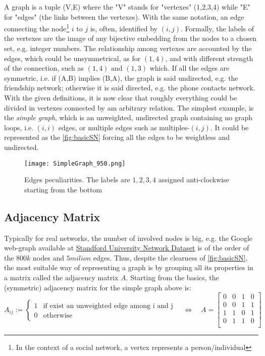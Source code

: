 \documentclass[a4paper,10pt,twoside]{book} %
\theoremstyle{definition}
\begin{document}
A graph is a tuple (V,E) where the "V" stands for "vertexes" (1,2,3,4) while "E" for "edges" (the links between the vertexes).
With the same notation, an edge connecting the node\footnote{In the context of a social network, a vertex represents a person/individual} $i$ to $j$ is, often, identified by $(i,j)$.
Formally, the labels of the vertexes are the image of any bijective embedding from the nodes to a chosen set, e.g. integer numbers. The relationship among vertexes are accounted by the edges, which could be unsymmetrical, as for $(1,4)$, and with different strength of the connection, such as $(1,4) \text{ and } (1,3)$ which. If all the edges are symmetric, i.e. if (A,B) implies (B,A), the graph is said undirected, e.g. the friendship network; otherwise it is said directed, e.g. the phone contacts network. 
With the given definitions, it is now clear that roughly everything could be divided in vertexes connected by am arbitrary relation.
The simplest example, is the \textit{simple graph}, which is an unweighted, undirected graph containing no graph loops, i.e. $(i,i)$ edges, or multiple edges such as multiples-$(i,j)$. It could be represented as the \autoref{fig:basicSN} forcing all the edges to be weightless and undirected.
\begin{figure}[ht]
	\texttt{[image: SimpleGraph\_950.png]}
	\caption{Edges peculiarities. The labels are $1,2,3,4$ assigned anti-clockwise starting from the bottom}
	\label{fig:simple}
\end{figure}
\newpage

\subsection{Adjacency Matrix}
Typically for real networks, the number of involved nodes is big, e.g. the Google web-graph available at \href{https://snap.stanford.edu/data/#socnets}{Standford University Network Dataset} is of the order of the $800k$ nodes and $5milion$ edges. Thus, despite the clearness of \autoref{fig:basicSN}, the most suitable way of representing a graph is by grouping all its properties in a matrix called the adjacency matrix $A$. 
Starting from the basics, the (symmetric) adjacency matrix for the simple graph above is:
\[
A_{ij} :=
\begin{cases}
1 & \text{if exist an unweighted edge among i and j} \\
0 & \text{otherwise}
\end{cases}
\quad
\Leftrightarrow
\quad
A = 
\begin{bmatrix}
0 & 0 & 1 & 0 \\
0 & 0 & 1 & 1 \\
1 & 1 & 0 & 1 \\
0 & 1 & 1 & 0 \\
\end{bmatrix}
\]
\end{document}
